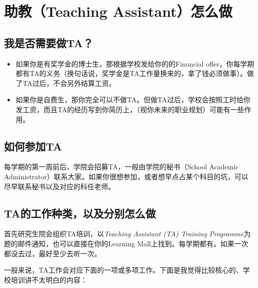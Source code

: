 \section{助教（Teaching Assistant）怎么做}

\subsection{我是否需要做TA？}
\begin{itemize}
    \item 如果你是有奖学金的博士生，那根据学校发给你的的Financial offer，你每学期都有TA的义务（换句话说，奖学金是TA工作量换来的，拿了钱必须做事）。做了TA过后，不会另外结算工资。
    \item 如果你是自费生，那你完全可以不做TA。但做TA过后，学校会按照工时给你发工资，而且TA的经历写到你简历上，（视你未来的职业规划）可能有一些作用。
\end{itemize}

\subsection{如何参加TA}
每学期的第一周前后，学院会招募TA，一般由学院的秘书（School Academic Administrator）联系大家。如果你很想参加，或者想早点占某个科目的坑，可以尽早联系秘书以及对应的科任老师。

\subsection{TA的工作种类，以及分别怎么做}

首先研究生院会组织TA培训，以\textit{Teaching Assistant (TA) Training Programme}为题的邮件通知，也可以直接在你的Learning Mall上找到。每学期都有。如果一次都没去过，最好至少去听一次。

一般来说，TA工作会对应下面的一项或多项工作。下面是我觉得比较核心的、学校培训讲不太明白的内容：

